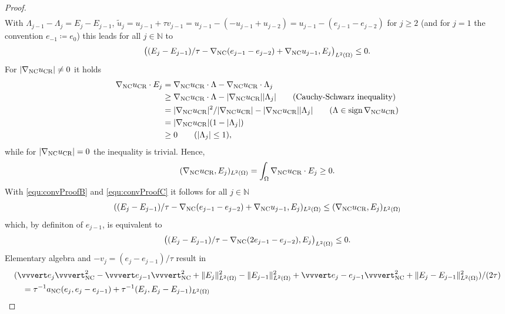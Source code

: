 \begin{proof}
\begin{align*}
  \end{align*}
  With $\Lambda_{j-1}-\Lambda_j=E_j-E_{j-1}$, 
  $\tilde{u}_j=u_{j-1}+\tau v_{j-1}=u_{j-1}-(-u_{j-1}+u_{j-2})=
  u_{j-1}-(e_{j-1}-e_{j-2})$
  for $j\geq 2$ (and for $j=1$ the convention $e_{-1}\coloneqq e_0$)
  this leads for all $j\in \mathbb N$ to
  \begin{align}
    \label{equ:convProofB}
    \big( (E_j-E_{j-1})/\tau-\nabla_\textup{NC} (e_{j-1}-e_{j-2})+
    \nabla_\textup{NC} u_{j-1},E_j\big)_{L^2(\Omega)}\leq 0.
  \end{align}
  For $|\nabla_\textup{NC} u_\textup{CR}|\neq 0$ it holds
  \begin{align*}
    \gradnc\ucr\cdot E_j 
    &=
    \gradnc\ucr\cdot\Lambda - \gradnc\ucr\cdot\Lambda_j\\
    &\geq 
    \gradnc\ucr\cdot\Lambda - |\gradnc\ucr||\Lambda_j| \tag{Cauchy-Schwarz inequality}\\
    &=
    |\gradnc\ucr|^2/|\gradnc\ucr|-|\gradnc\ucr||\Lambda_j| 
    \tag{$\Lambda\in\operatorname{sign}\gradnc\ucr$}\\
    &= 
    |\gradnc\ucr|(1-|\Lambda_j|)\\
    &\geq
    0 \tag{$|\Lambda_j|\leq 1$},
  \end{align*}
  while for $|\nabla_\textup{NC}u_\textup{CR}|=0$ the inequality is trivial.
  Hence,
  \begin{align}
    \label{equ:convProofC}
    (\nabla_\textup{NC}u_\textup{CR},E_j)_{L^2(\Omega)}=\int_\Omega \nabla_\textup{NC}u_\textup{CR}\cdot E_j\geq 0.
  \end{align}
  With \eqref{equ:convProofB} and \eqref{equ:convProofC} it follows for all
  $j\in\mathbb N$
  \begin{align*}
    ( (E_j-E_{j-1})/\tau-\nabla_{\textup{NC}}(e_{j-1}-e_{j-2})+
    \nabla_{\textup{NC}} u_{j-1},E_j)_{L^2(\Omega)}
    \leq
    (\nabla_\textup{NC}u_\textup{CR},E_j)_{L^2(\Omega)}
  \end{align*}
  which, by definiton of $e_{j-1}$, is equivalent to
  \begin{align}
    \label{equ:convProofD}
    \big( (E_j-E_{j-1})/\tau -\nabla_\textup{NC}(2e_{j-1}-e_{j-2}),E_j\big)_{L^2(\Omega)}\leq 0.
  \end{align}
  Elementary algebra and $-v_j=(e_j-e_{j-1})/\tau$ result in
  \begin{align*}
    &(\vvvert e_j \vvvert^2_\nc   -
    \vvvert e_{j-1}\vvvert_\nc^2 +
    \Vert E_j \Vert_{L^2(\Omega)}^2 - \Vert E_{j-1}\Vert_{L^2(\Omega)}^2 +
    \vvvert e_j-e_{j-1}\vvvert_\nc^2 +
    \Vert E_j - E_{j-1} \Vert_{L^2(\Omega)}^2)/(2\tau) \\
    &\quad =
    \tau^{-1}a_\nc(e_j,e_j-e_{j-1}) + \tau^{-1}(E_j,E_j-E_{j-1})_{L^2(\Omega)}\\

\end{align*}
\end{proof}
